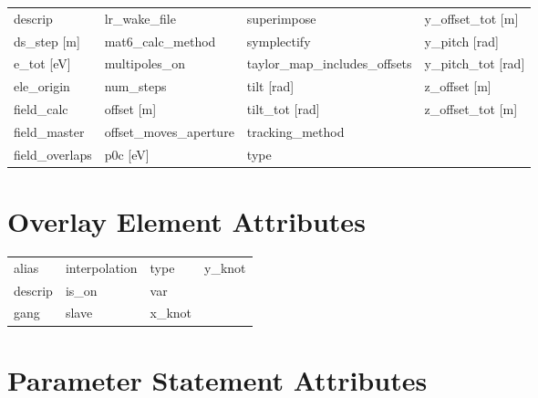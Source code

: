 \begin{tabular}{llll}
descrip                          & lr_wake_file                     & superimpose                      & y_offset_tot [m]                 \\
ds_step [m]                      & mat6_calc_method                 & symplectify                      & y_pitch [rad]                    \\
e_tot [eV]                       & multipoles_on                    & taylor_map_includes_offsets      & y_pitch_tot [rad]                \\
ele_origin                       & num_steps                        & tilt [rad]                       & z_offset [m]                     \\
field_calc                       & offset [m]                       & tilt_tot [rad]                   & z_offset_tot [m]                 \\
field_master                     & offset_moves_aperture            & tracking_method                  &                                  \\
field_overlaps                   & p0c [eV]                         & type                             &                                  \\
 \bottomrule
 \end{tabular}
 \vfill
 
 \section{Overlay Element Attributes}
 \label{s:list.overlay}
 
 \begin{tabular}{llll} \toprule
alias                            & interpolation                    & type                             & y_knot                           \\
descrip                          & is_on                            & var                              &                                  \\
gang                             & slave                            & x_knot                           &                                  \\
 \bottomrule
 \end{tabular}
 \vfill
 
 \section{Parameter Statement Attributes}
 \label{s:list.parameter}
 
